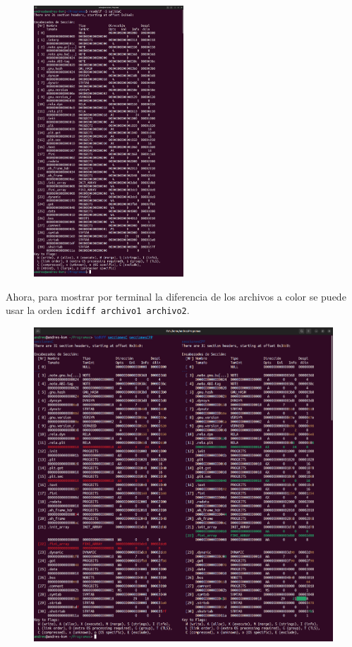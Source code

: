 \documentclass{article}
\begin{document}
\begin{figure}[H]
    \centering
    \includegraphics[width=0.5\textwidth]{imagenes/C/merged.png}
\end{figure}

Ahora, para mostrar por terminal la diferencia de los archivos a color se puede usar la orden \verb|icdiff archivo1 archivo2|.

\begin{figure}[H]
    \includegraphics[width=\textwidth]{imagenes/icdiff/mergedicdiff.png}
\end{figure}
\end{document}
